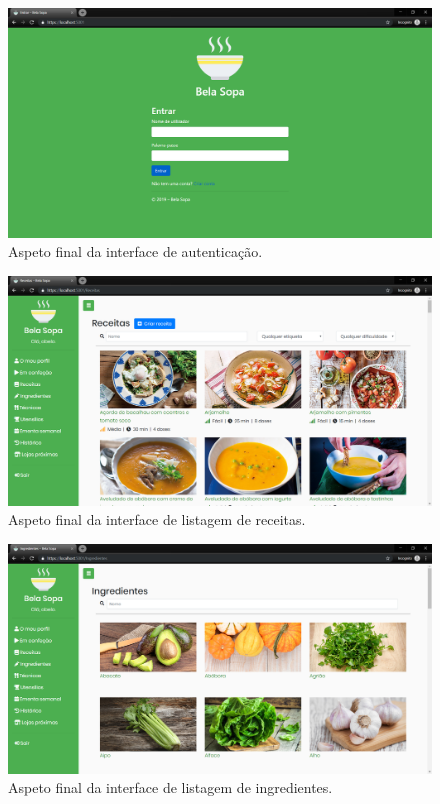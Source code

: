 \begin{landscape}

\begin{figure}[p]
  \centering
  \includegraphics[height=.85\textheight]{figures/11/final-1.png}
  \caption{Aspeto final da interface de autenticação.}
  \label{fig:construcao:final-1}
\end{figure}

\begin{figure}[p]
  \centering
  \includegraphics[height=.85\textheight]{figures/11/final-2.png}
  \caption{Aspeto final da interface de listagem de receitas.}
  \label{fig:construcao:final-2}
\end{figure}

\begin{figure}[p]
  \centering
  \includegraphics[height=.85\textheight]{figures/11/final-3.png}
  \caption{Aspeto final da interface de listagem de ingredientes.}
  \label{fig:construcao:final-3}
\end{figure}


\end{landscape}
